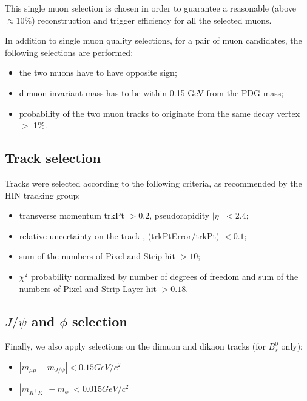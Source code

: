This single muon selection is chosen in order to guarantee a reasonable (above $\approx10\%$) reconstruction and trigger efficiency for all the selected muons. %

In addition to single muon quality selections, for a pair of muon candidates, the following selections are performed:
\begin{itemize}
\item the two muons have to have opposite sign;
\item dimuon invariant mass has to be within 0.15 GeV from the PDG \Jpsi mass;
\item probability of the two muon tracks to originate from the same decay vertex $>$ 1\%.
\end{itemize}


\subsection {Track selection}
\label{sec:tracksel}



Tracks were selected according to the following criteria, as recommended by the HIN tracking group:
\begin{itemize}
\item transverse momentum trkPt $> 0.2$, pseudorapidity $|\eta|$ $< 2.4$;
\item relative uncertainty on the track \pt, (trkPtError/trkPt) $< 0.1$;
\item sum of the numbers of Pixel and Strip hit $> 10$;
\item $\chi^2$ probability normalized by number of degrees of freedom and sum of the numbers of Pixel and Strip Layer hit $> 0.18$.
\end{itemize}

\subsection {$J/\psi$ and $\phi$ selection}

Finally, we also apply selections on the dimuon and dikaon tracks (for $B^0_s$ only):

\begin{itemize}
\item $|m_{\mu\mu} - m_{J/\psi}| < 0.15 GeV/c^{2}$
\item $|m_{K^{+}K^{-}} - m_{\phi}| < 0.015 GeV/c^{2}$
\end{itemize}




\clearpage
